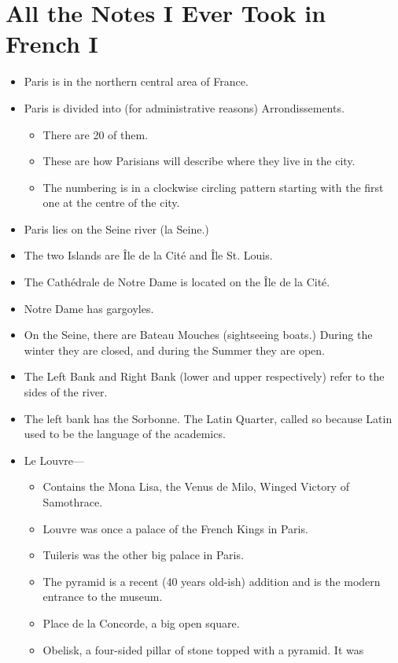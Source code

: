 \documentclass[11pt]{article}
\begin{document}
\section*{All the Notes I Ever Took in French I}
\begin{itemize}
	\item Paris is in the northern central area of France.
	\item Paris is divided into (for administrative reasons) Arrondissements.
		\begin{itemize}
			\item There are 20 of them.
			\item These are how Parisians will describe where they live in the city.
			\item The numbering is in a clockwise circling pattern starting 
				with the first one at the centre of the city.
		\end{itemize}
	\item Paris lies on the Seine river (la Seine.)
	\item The two Islands are \^{I}le de la Cit\'{e} and \^{I}le St. Louis.
	\item The Cath\'{e}drale de Notre Dame is located on the \^{I}le de la
		Cit\'{e}.
	\item Notre Dame has gargoyles.
	\item On the Seine, there are Bateau Mouches (sightseeing boats.)  During the
		winter they are closed, and during the Summer they are open.
	\item The Left Bank and Right Bank (lower and upper respectively) refer to
		the sides of the river.
	\item The left bank has the Sorbonne.  The Latin Quarter, called so because 
		Latin used to be the language of the academics.
	\item Le Louvre---
		\begin{itemize}
			\item Contains the Mona Lisa, the Venus de Milo, Winged Victory of 
				Samothrace.
			\item Louvre was once a palace of the French Kings in Paris.
			\item Tuileris was the other big palace in Paris.
			\item The pyramid is a recent (40 years old-ish) addition and is the
				modern entrance to the museum.
			\item Place de la Concorde, a big open square.
			\item Obelisk, a four-sided pillar of stone topped with a pyramid.  It was

\end{itemize}
\end{itemize}
\end{document}
